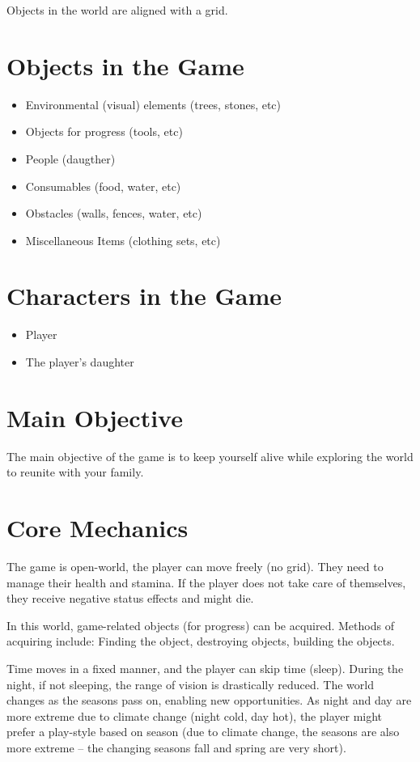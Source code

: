 \documentclass[a4paper]{scrreprt}
\begin{document}
Objects in the world are aligned with a grid.

\section{Objects in the Game}
\begin{itemize}
    \item Environmental (visual) elements (trees, stones, etc)
    \item Objects for progress (tools, etc)
    \item People (daugther)
    \item Consumables (food, water, etc)
    \item Obstacles (walls, fences, water, etc)
    \item Miscellaneous Items (clothing sets, etc)
\end{itemize}

\section{Characters in the Game}
\begin{itemize}
    \item Player
    \item The player's daughter
\end{itemize}

\section{Main Objective}
The main objective of the game is to keep yourself alive while exploring the world to reunite with your family.

\section{Core Mechanics}
The game is open-world, the player can move freely (no grid). They need to manage their health and stamina. If the player does not take care of themselves, they receive negative status effects and might die.

In this world, game-related objects (for progress) can be acquired. Methods of acquiring include: Finding the object, destroying objects, building the objects.

Time moves in a fixed manner, and the player can skip time (sleep). During the night, if not sleeping, the range of vision is drastically reduced. The world changes as the seasons pass on, enabling new opportunities. As night and day are more extreme due to climate change (night cold, day hot), the player might prefer a play-style based on season (due to climate change, the seasons are also more extreme -- the changing seasons fall and spring are very short).
\end{document}

